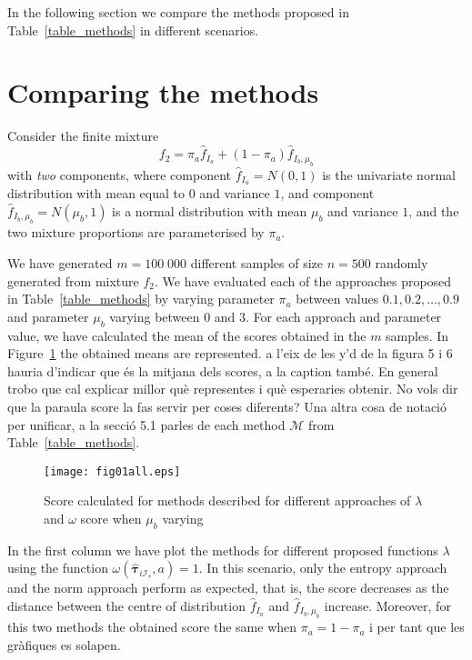 \documentclass[10pt, a4paper]{article}
\newcommand{\m}[1]{\boldsymbol{#1}}
\begin{document}
In the following section we compare the methods proposed in Table~\ref{table_methods} in different scenarios.

\section{Comparing the methods}
\label{comparison}

Consider the finite mixture
\begin{equation}\label{two_mixture}
f_2 = \pi_a \hat{f}_{I_a} + (1 - \pi_a) \hat{f}_{I_b, \mu_b}
\end{equation}
with \emph{two} components, where component $\hat{f}_{I_a} = N(0, 1)$ is the univariate normal distribution with mean equal to $0$ and variance $1$, and component $\hat{f}_{I_b, \mu_b} = N(\mu_b, 1)$ is a normal distribution with mean $\mu_b$ and variance $1$, and the two mixture proportions are parameterised by $\pi_a$.

We have generated $m=100\;000$ different samples of size $n=500$ randomly generated from mixture $f_2$. We have evaluated each of the approaches proposed in Table~\ref{table_methods} by varying parameter $\pi_a$ between values $0.1, 0.2, \dots, 0.9$ and parameter $\mu_b$ varying between $0$ and $3$. For each approach and parameter value, we have calculated the mean of the scores obtained in the $m$ samples. In Figure~\ref{fig:mu_varying} the obtained means are represented. {\color{blue} a l'eix de les y'd de la figura 5 i 6 hauria d'indicar que \'{e}s la mitjana dels scores, a la caption tamb\'{e}. En general trobo que cal explicar millor qu\`{e} representes i qu\`{e} esperaries obtenir. No vols dir que la paraula score la fas servir per coses diferents? Una altra cosa de notaci\'{o} per unificar, a la secci\'{o} 5.1 parles de each method $\mathcal{M}$ from Table~\ref{table_methods}.}

\begin{figure}[!t]
\centering
\texttt{[image: fig01all.eps]}
\caption{Score calculated for methods described for different approaches of $\lambda$ and $\omega$ score when $\mu_b$ varying}
\label{fig:mu_varying}
\end{figure}

In the first column we have plot the methods for different proposed functions $\lambda$ using the function $\omega(\hat{\m \tau}_{i \mathcal{I}_s}, a) = 1$. In this scenario, only the entropy approach and the norm approach perform as expected, that is, the score decreases as the distance between the centre of distribution $\hat{f}_{I_a}$ and $\hat{f}_{I_b, \mu_b}$ increase. Moreover, for this two methods the obtained score the same when $\pi_a = 1- \pi_a$ {\color{blue} i per tant que les gr\`{a}fiques es solapen}.
\end{document}

